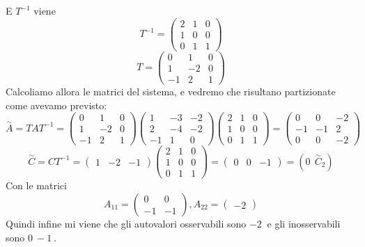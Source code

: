 \documentclass{article}
\begin{document}
E $T^{-1}$ viene \[ 
T^{-1} = \left(\begin{matrix}2 & 1 & 0\\1 & 0 & 0\\0 & 1 & 1\end{matrix}\right) \]
\[ 
T = \left(\begin{matrix}0 & 1 & 0\\1 & -2 & 0\\-1 & 2 & 1\end{matrix}\right) \]Calcoliamo allora le matrici del sistema, e vedremo che risultano partizionate come avevamo previsto:
\[ 
\overset{\sim}{A} = T A  T^{-1} = \left(\begin{matrix}0 & 1 & 0\\1 & -2 & 0\\-1 & 2 & 1\end{matrix}\right)\left(\begin{matrix}1 & -3 & -2\\2 & -4 & -2\\-1 & 1 & 0\end{matrix}\right)\left(\begin{matrix}2 & 1 & 0\\1 & 0 & 0\\0 & 1 & 1\end{matrix}\right) = \left(\begin{matrix}0 & 0 & -2\\-1 & -1 & 2\\0 & 0 & -2\end{matrix}\right) \]
\[ 
\overset{\sim}{C} = CT^{-1} = \left(\begin{matrix}1 & -2 & -1\end{matrix}\right)\left(\begin{matrix}2 & 1 & 0\\1 & 0 & 0\\0 & 1 & 1\end{matrix}\right) = \left(\begin{matrix}0 & 0 & -1\end{matrix}\right) = ( 0\ \ \overset{\sim}{C}_2) \]
Con le matrici \[ A_{11} = \left(\begin{matrix}0 & 0\\-1 & -1\end{matrix}\right) , A_{22} = \left(\begin{matrix}-2\end{matrix}\right) \]Quindi infine mi viene che gli autovalori osservabili sono $ -2\  $ e gli inosservabili sono $ 0\ -1\  $.
\end{document}
